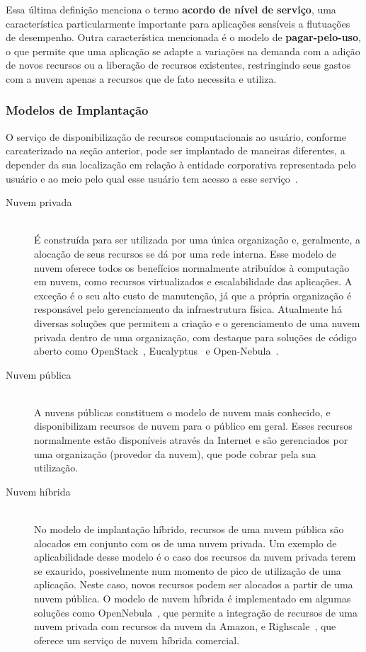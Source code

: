Essa última definição menciona o termo \textbf{acordo de nível de serviço}, uma 
característica particularmente importante para aplicações sensíveis a flutuações 
de desempenho. Outra característica mencionada é o modelo de \textbf{pagar-pelo-uso}, 
o que permite que uma aplicação se adapte a variações na demanda com a adição de 
novos recursos ou a liberação de recursos existentes, restringindo seus gastos 
com a nuvem apenas a recursos que de fato necessita e utiliza.

\subsubsection{Modelos de Implantação}
O serviço de disponibilização de recursos computacionais ao usuário, conforme
carcaterizado na seção anterior, pode ser implantado de maneiras diferentes,
a depender da sua localização em relação à entidade corporativa representada pelo
usuário e ao meio pelo qual esse usuário tem acesso a esse 
serviço~\cite{armbrust2009above,Zhang2010}.
 
\begin{description}
\item[Nuvem privada] \hfill \\ É construída para ser utilizada por uma única 
organização e, geralmente, a alocação de seus recursos se dá por uma rede interna. 
Esse modelo de nuvem oferece todos os benefícios normalmente atribuídos à computação 
em nuvem, como recursos virtualizados e escalabilidade das aplicações. A exceção 
é o seu alto custo de manutenção, já que a própria organização é responsável pelo 
gerenciamento da infraestrutura física. Atualmente há diversas soluções que permitem 
a criação e o gerenciamento de uma nuvem privada dentro de uma organização, com 
destaque para soluções de código aberto como OpenStack~\cite{openstack}, 
Eucalyptus~\cite{eucalyptus} e Open-Nebula~\cite{opennebula}.
\item[Nuvem pública] \hfill \\ A nuvens públicas constituem o modelo de nuvem 
mais conhecido, e disponibilizam recursos de nuvem para o público em geral. Esses 
recursos normalmente estão disponíveis através da Internet e são gerenciados por 
uma organização (provedor da nuvem), que pode cobrar pela sua utilização. 
\item[Nuvem híbrida] \hfill \\ No modelo de implantação híbrido, recursos de uma 
nuvem pública são alocados em conjunto com os de uma nuvem privada. Um exemplo de 
aplicabilidade desse modelo é o caso dos recursos da nuvem privada terem se exaurido,
possivelmente num momento de pico de utilização de uma aplicação. Neste caso, 
novos recursos podem ser alocados a partir de uma nuvem pública. O modelo de 
nuvem híbrida é implementado em algumas soluções como OpenNebula~\cite{opennebula}, 
que permite a integração de recursos de uma nuvem privada com recursos da nuvem 
da Amazon, e Righscale~\cite{rightscale}, que oferece um serviço de nuvem híbrida 
comercial.
\end{description}


